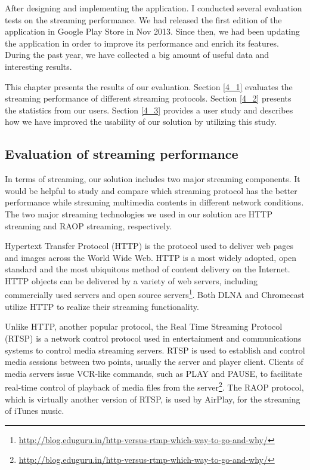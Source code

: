 
After designing and implementing the application. I conducted several
evaluation tests on the streaming performance. We had released the first
edition of the application in Google Play Store in Nov 2013. Since then, we had
been updating the application in order to improve its performance and enrich
its features. During the past year, we have collected a big amount of
useful data and interesting results.

This chapter presents the results of our evaluation. Section \ref{4_1} evaluates
the streaming performance of different streaming protocols. Section \ref{4_2}
presents the statistics from our users. Section \ref{4_3} provides a user study
and describes how we have improved the usability of our solution by utilizing
this study.
\subsection{Evaluation of streaming performance\label{4_1}}
In terms of streaming, our solution includes two major streaming components. It
would be helpful to study and compare which streaming protocol has the better
performance while streaming multimedia contents in different network conditions.
The two major streaming technologies we used in our solution are HTTP streaming
and RAOP streaming, respectively.

Hypertext Transfer Protocol (HTTP) \cite{http_rfc} is the protocol used to
deliver web pages and images across the World Wide Web. HTTP is a most widely adopted, open
standard and the most ubiquitous method of content delivery on the Internet.
HTTP objects can be delivered by a variety of web servers, including
commercially used servers and open source
servers\footnote{\url{http://blog.eduguru.in/http-versus-rtmp-which-way-to-go-and-why/}}.
Both DLNA and Chromecast utilize HTTP to realize their streaming functionality.

Unlike HTTP, another popular protocol, the Real Time Streaming Protocol (RTSP)
\cite{rtsp_rfc} is a network control protocol used in entertainment and
communications systems to control media streaming servers. RTSP is used to establish and control media
sessions between two points, usually the server and player client. Clients of
media servers issue VCR-like commands, such as PLAY and PAUSE, to facilitate
real-time control of playback of media files from the
server\footnote{\url{http://blog.eduguru.in/http-versus-rtmp-which-way-to-go-and-why/}}.
The RAOP protocol, which is virtually another version of RTSP, is used by AirPlay, for
the streaming of iTunes music.

